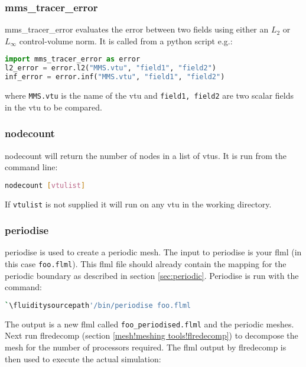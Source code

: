 
\subsubsection{mms\_tracer\_error}
\label{sec:mms_tracer_error}

mms\_tracer\_error evaluates the error between two fields using either an $L_2$ or $L_\infty$ control-volume norm. It is called from a python script e.g.:
\begin{lstlisting}[language = python]
import mms_tracer_error as error
l2_error = error.l2("MMS.vtu", "field1", "field2")
inf_error = error.inf("MMS.vtu", "field1", "field2")
\end{lstlisting}
where \lstinline[language = python]+MMS.vtu+ is the name of the vtu and \lstinline[language = python]+field1, field2+ are two scalar fields in the vtu to be compared.


\subsubsection{nodecount}
\label{sec:nodecount}
nodecount will return the number of nodes in a list of vtus. It is run from the command line:
\begin{lstlisting}[language = Bash]
nodecount [vtulist]
\end{lstlisting}
If \lstinline[language = Bash]+vtulist+ is not supplied it will run on any vtu in the working directory.


\subsubsection{periodise}
\label{sec:periodise}
periodise is used to create a periodic mesh. The input to periodise is your flml (in this case
\lstinline{foo.flml}). This flml file should already contain the mapping for
the periodic boundary as described in section
\ref{sec:periodic}. Periodise is run with the command:

\begin{lstlisting}[language=bash]
`\fluiditysourcepath'/bin/periodise foo.flml
\end{lstlisting}

The output is a new flml called \lstinline+foo_periodised.flml+ and the
periodic meshes. Next run flredecomp (section \ref{mesh!meshing
  tools!flredecomp}) to decompose the mesh for the number of processors
required. The flml output by flredecomp is then used to execute the actual simulation:

